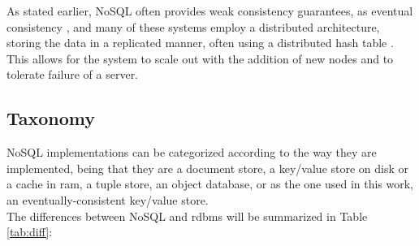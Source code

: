 As stated earlier, NoSQL often provides weak consistency guarantees, as eventual consistency \cite{Vogels2008}, and many of these systems employ a distributed architecture, storing the data in a replicated manner, often using a distributed hash table \cite{Tanner}. This allows for the system to scale out with the addition of new nodes and to tolerate failure of a server.

\subsection{Taxonomy}
NoSQL implementations can be categorized according to the way they are implemented, being that they are a document store, a key/value store on disk or a cache in \ac{ram}, a tuple store, an object database, or as the one used in this work, an eventually-consistent key/value store.\\

The differences between NoSQL and \ac{rdbms} will be summarized in Table \ref{tab:diff}:\\

\begin{table}[h!b!p!]
\caption{Differences between NoSQL and RDBMS}
\label{tab:diff}
\end{table}	  
		
